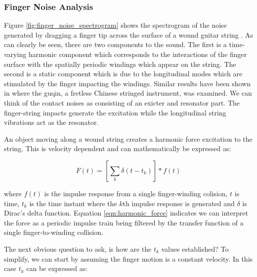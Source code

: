 \documentclass[main.tex]{subfiles}
\begin{document}
\subsubsection{Finger Noise Analysis}

Figure \ref{fig:finger_noise_spectrogram} shows the spectrogram of the noise generated by dragging a finger tip across the surface of a wound guitar string . As can clearly be seen, there are two components to the sound. The first is a time-varying harmonic component which corresponds to the interactions of the finger surface with the spatially periodic windings which appear on the string. The second is a static component which is due to the longitudinal modes which are stimulated by the finger impacting the windings. Similar results have been shown in  where the guqin, a fretless Chinese stringed instrument, was examined. We can think of the contact noises as consisting of an exicter and resonator part. The finger-string impacts generate the excitation while the longitudinal string vibrations act as the resonator.

An object moving along a wound string creates a harmonic force excitation to the string. This is velocity dependent and can mathematically be expressed as:

\begin{equation}
    F(t) = \left[\sum_k \delta(t-t_k)\right] \ast f(t)
    \label{eqn:harmonic_force}
\end{equation}

where $f(t)$ is the impulse response from a single finger-winding colision, $t$ is time, $t_k$ is the time instant where the $k$th impulse response is generated and $\delta$ is Dirac's delta function. Equation \ref{eqn:harmonic_force} indicates we can interpret the force as a periodic impulse train being filtered by the transfer function of a single finger-to-winding collision.

The next obvious question to ask, is how are the $t_k$ values established? To simplify, we can start by assuming the finger motion is a constant velocity. In this case $t_k$ can be expressed as:
\end{document}
